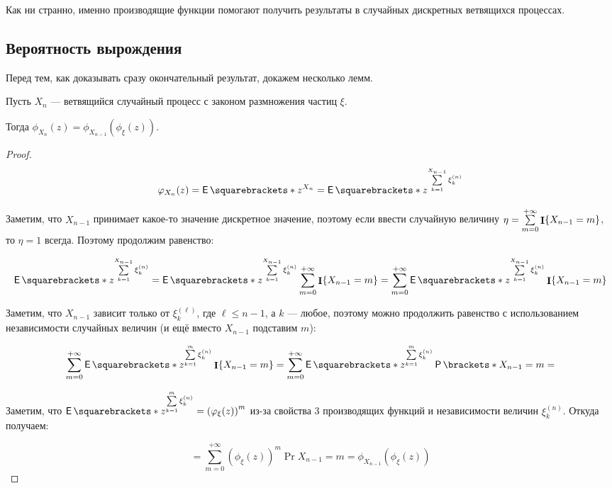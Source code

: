 Как ни странно, именно производящие функции помогают получить результаты в случайных
дискретных ветвящихся процессах.

\subsection{Вероятность вырождения}

Перед тем, как доказывать сразу окончательный результат, докажем несколько лемм.

\begin{lemma}[О зависимости $X_n$ и $X_{n - 1}$]
  Пусть $X_n$ --- ветвящийся случайный процесс с законом размножения частиц $\xi$.

  Тогда $\phi_{X_n}(z) = \phi_{X_{n - 1}}(\phi_\xi(z))$.
\end{lemma}

\begin{proof}
  \[
    \phi_{X_n}(z) = \E{z^{X_n}} = \E{z^{\sum\limits_{k = 1}^{X_{n - 1}} \xi_k^{(n)}}}
  \]

  Заметим, что $X_{n - 1}$ принимает какое-то значение дискретное значение,
  поэтому если ввести случайную величину $\eta = \sum\limits_{m = 0}^{+\infty} 
  \mathop{\mathbf{I}}\{X_{n - 1} = m\}$, то $\eta = 1$ всегда. Поэтому продолжим равенство:

  \[
    \E{z^{\sum\limits_{k = 1}^{X_{n - 1}} \xi_k^{(n)}}} =
    \E{z^{\sum\limits_{k = 1}^{X_{n - 1}} \xi_k^{(n)}} \sum\limits_{m = 0}^{+\infty} 
    \I\{X_{n - 1} = m\}} = \sum\limits_{m = 0}^{+\infty} \E{z^{\sum\limits_{k = 
    1}^{X_{n - 1}} \xi_k^{(n)}}\I\{X_{n - 1} = m\}}
  \]

  Заметим, что $X_{n - 1}$ зависит только от $\xi_k^{(\ell)}$, где $\ell \leq n - 1$,
  а $k$ --- любое, поэтому можно продолжить равенство с использованием
  независимости случайных величин (и ещё вместо $X_{n - 1}$
  подставим $m$):

  \[
    \sum\limits_{m = 0}^{+\infty} \E{z^{\sum\limits_{k = 1}^{m}
    \xi_k^{(n)}}\I\{X_{n - 1} = m\}} = \sum\limits_{m = 0}^{+\infty} \E{z^{\sum\limits_{k = 1}^{m}
    \xi_k^{(n)}}} \Pr{X_{n - 1} = m} = 
  \]

  Заметим, что $\E{z^{\sum\limits_{k = 1}^{m} \xi_k^{(n)}}} = 
  \left(\phi_{\xi}(z)\right)^m$ из-за свойства 3 производящих функций и независимости
  величин $\xi_k^{(n)}$. Откуда получаем:

  \[
    = \sum\limits_{m = 0}^{+\infty} \left(\phi_{\xi}(z)\right)^m \Pr{X_{n - 1} = m} =
    \phi_{X_{n - 1}}(\phi_{\xi}(z))
  \]
\end{proof}

